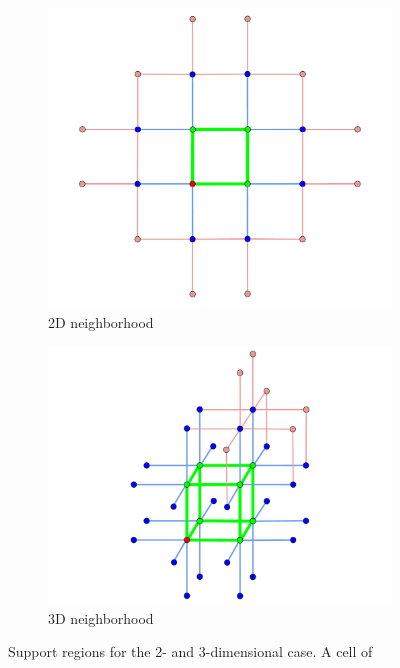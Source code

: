 \begin{figure}
  \centering
  \begin{subfigure}[b]{0.4\textwidth}
    \includegraphics[width=\textwidth]{Images/2DNH.pdf}
    \caption{2D neighborhood}
    \label{fig:2DNH}
  \end{subfigure}
  \begin{subfigure}[b]{0.49\textwidth}
    \includegraphics[width=\textwidth]{Images/3DNH.pdf}
    \caption{3D neighborhood}
    \label{fig:3DNH}
  \end{subfigure}
  \caption{Support regions for the 2- and 3-dimensional case. A cell of
}
\end{figure}
